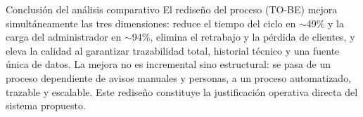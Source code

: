 \begin{upeubox}{Conclusión del análisis comparativo}
El rediseño del proceso (TO-BE) mejora simultáneamente las tres dimensiones: reduce
el tiempo del ciclo en $\sim$49\% y la carga del administrador en $\sim$94\%, elimina
el retrabajo y la pérdida de clientes, y eleva la calidad al garantizar trazabilidad
total, historial técnico y una fuente única de datos. La mejora no es incremental sino
estructural: se pasa de un proceso dependiente de avisos manuales y personas, a un
proceso automatizado, trazable y escalable. Este rediseño constituye la justificación
operativa directa del sistema propuesto.
\end{upeubox}
